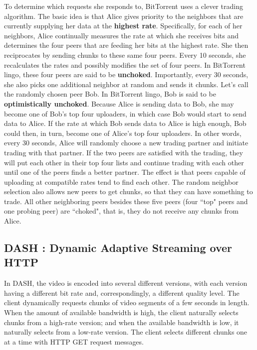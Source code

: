 \documentclass[11pt]{article}
\begin{document}
To determine which requests she responds to, BitTorrent uses a clever trading algorithm. The basic idea is that Alice gives priority to the neighbors that are currently supplying her data at the \textbf{highest rate}. Specifically, for each of her neighbors, Alice continually measures the rate at which she receives bits and determines the four peers that are feeding her bits at the highest rate. She then reciprocates by sending chunks to these same four peers. Every 10 seconds, she recalculates the rates and possibly modifies the set of four peers. In BitTorrent lingo, these four peers are said to be \textbf{unchoked}. Importantly, every 30 seconds, she also picks one additional neighbor at random and sends it chunks. Let’s call the randomly chosen peer Bob. In BitTorrent lingo, Bob is said to be \textbf{optimistically unchoked}. Because Alice is sending data to Bob, she may become one of Bob’s top four uploaders, in which case Bob would start to send data to Alice. If the rate at which Bob sends data to Alice is high enough, Bob could then, in turn, become one of Alice’s top four uploaders. In other words, every 30 seconds, Alice will randomly choose a new trading partner and initiate trading with that partner. If the two peers are satisfied with the trading, they will put each other in their top four lists and continue trading with each other until one of the peers finds a better partner. The effect is that peers capable of uploading at compatible rates tend to find each other. The random neighbor selection also allows new peers to get chunks, so that they can have something to trade. All other neighboring peers besides these five peers (four ``top" peers and one probing peer) are ``choked", that is, they do not receive any chunks from Alice.

\subsection{DASH : Dynamic Adaptive Streaming over HTTP}

In DASH, the video is encoded into several different versions, with each version having a different bit rate and, correspondingly, a different quality level. The client dynamically requests chunks of video segments of a few seconds in length. When the amount of available bandwidth is high, the client naturally selects chunks from a high-rate version; and when the available bandwidth is low, it naturally selects from a low-rate version. The client selects different chunks one at a time with HTTP GET request messages.
\end{document}
